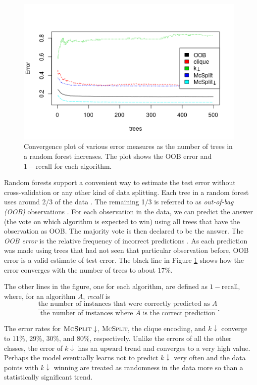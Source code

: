 \documentclass{l4proj}
\theoremstyle{definition}
\theoremstyle{remark}
\begin{document}
\begin{figure}
  \centering
  \includegraphics[scale=0.7]{images/unlabelled_forest_errors.png}
  \caption{Convergence plot of various error measures as the number of trees in
    a random forest increases. The plot shows the OOB error and $1 -
    \text{recall}$ for each algorithm.}
  \label{fig:unlabelled_forest_errors}
\end{figure}

Random forests support a convenient way to estimate the test error without
cross-validation or any other kind of data splitting. Each tree in a random
forest uses around 2/3 of the data \cite{James:2014:ISL:2517747}. The remaining
1/3 is referred to as \emph{out-of-bag (OOB)} observations . For each
observation in the data, we can predict the answer (the vote on which algorithm
is expected to win) using all trees that have the observation as OOB. The
majority vote is then declared to be the answer. The \emph{OOB error} is
the relative frequency of incorrect predictions \cite{James:2014:ISL:2517747}.
As each prediction was made using trees that had not seen that particular
observation before, OOB error is a valid estimate of test error. The black line
in Figure \ref{fig:unlabelled_forest_errors} shows how the error converges with
the number of trees to about 17\%.

The other lines in the figure, one for each algorithm, are defined as $1 -
\text{recall}$, where, for an algorithm $A$, \emph{recall}
\cite{citeulike:12882259} is
\[ \frac{\text{the number of instances that were correctly predicted as
      $A$}}{\text{the number of instances where $A$ is the correct
      prediction}}. \]

The error rates for $\textsc{McSplit}\downarrow$, \textsc{McSplit}, the clique
encoding, and $k\downarrow$ converge to 11\%, 29\%, 30\%, and 80\%,
respectively. Unlike the errors of all the other classes, the error of
$k\downarrow$ has an upward trend and converges to a very high value. Perhaps
the model eventually learns not to predict $k\downarrow$ very often and the data
points with $k\downarrow$ winning are treated as randomness in the data more so
than a statistically significant trend.
\end{document}
